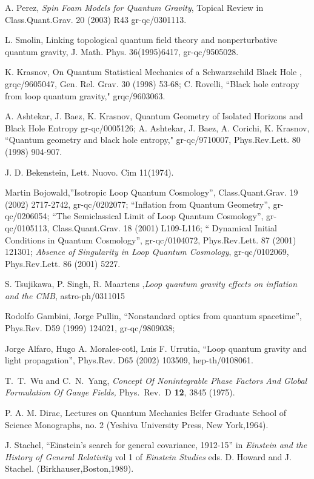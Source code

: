 \documentclass[12pt]{article}
\begin{document}
\begin{thebibliography}{0}
{A. Perez,
{\it Spin Foam Models for Quantum Gravity}, 
Topical Review in Class.Quant.Grav. 20 (2003) R43
gr-qc/0301113.

L. Smolin, Linking topological quantum
field theory and nonperturbative quantum gravity,
J. Math. Phys. 36(1995)6417, gr-qc/9505028.

K. Krasnov, On Quantum Statistical
Mechanics of a Schwarzschild Black Hole , grqc/9605047, Gen. Rel. Grav.
30 (1998) 53-68; C. Rovelli, ``Black hole entropy from loop quantum gravity,"
grqc/9603063.

A. Ashtekar, J. Baez, K. Krasnov, Quantum Geometry of
Isolated Horizons and Black
Hole Entropy gr-qc/0005126; A. Ashtekar, J. Baez, A. Corichi, K. Krasnov,
``Quantum geometry and black hole entropy," gr-qc/9710007,
Phys.Rev.Lett. 80 (1998) 904-907.

J. D. Bekenstein, Lett. Nuovo. Cim 11(1974).

Martin Bojowald,''Isotropic Loop Quantum Cosmology'',
Class.Quant.Grav. 19 (2002) 2717-2742,   gr-qc/0202077;
    ``Inflation from Quantum Geometry'', gr-qc/0206054;
    ``The Semiclassical Limit of Loop Quantum Cosmology'',
gr-qc/0105113, Class.Quant.Grav. 18 (2001) L109-L116;
`` Dynamical Initial Conditions in Quantum Cosmology'',
gr-qc/0104072,  Phys.Rev.Lett. 87 (2001) 121301;
{\it Absence of Singularity in Loop Quantum Cosmology}, 
gr-qc/0102069, Phys.Rev.Lett. 86 (2001) 5227.  

S. Tsujikawa, P.  Singh, R. Maartens ,{\it Loop quantum gravity effects on inflation and the CMB}, astro-ph/0311015 

Rodolfo Gambini, Jorge Pullin, ``Nonstandard optics from quantum
spacetime'', Phys.Rev. D59 (1999) 124021, gr-qc/9809038;

Jorge Alfaro, Hugo A. Morales-cotl, Luis F. Urrutia,
``Loop quantum gravity and light propagation'',  Phys.Rev. D65 (2002)
103509, hep-th/0108061.

  T.~T.~Wu and C.~N.~Yang,
 {\it Concept Of Nonintegrable Phase Factors And Global Formulation Of Gauge
 Fields,}   Phys.\ Rev.\ D {\bf 12}, 3845 (1975).


P. A. M. Dirac, Lectures on Quantum Mechanics Belfer
Graduate School of Science Monographs, no. 2 (Yeshiva University Press,
New York,1964).

J. Stachel, ``Einstein's search for general
covariance, 1912-15'' in {\it Einstein and the History of General
Relativity} vol 1 of {\it Einstein Studies} eds. D. Howard and J.
Stachel. (Birkhauser,Boston,1989).

}
\end{thebibliography}
\end{document}
